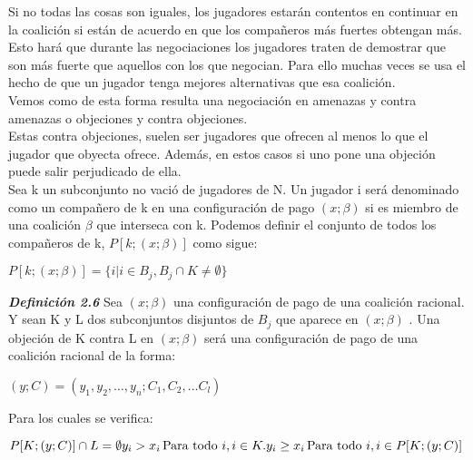 \documentclass[10pt,a4paper]{book}
\begin{document}
Si no todas las cosas son iguales, los jugadores estarán contentos en continuar en la coalición si están de acuerdo en que los compañeros más fuertes obtengan más.\\

Esto hará que durante las negociaciones los jugadores traten de demostrar que son más fuerte que aquellos con los que negocian. Para ello muchas veces se usa el hecho de que un jugador tenga mejores alternativas que esa coalición.\\

Vemos como de esta forma resulta una negociación en amenazas y contra amenazas o objeciones y contra objeciones.\\

Estas contra objeciones, suelen ser jugadores que ofrecen al menos lo que el jugador que obyecta ofrece. Además, en estos casos si uno pone una objeción puede salir perjudicado de ella.\\

Sea k un subconjunto no vació de jugadores de N. Un jugador i será denominado como un compañero de k en una configuración de pago $(x;\beta)$ si es miembro de una coalición $\beta$ que interseca con k. Podemos definir el conjunto de todos los compañeros de k, $P[k; (x;\beta)] $ como sigue:\\

\begin{center}

$P[k; (x;\beta)]=\{i| i \in B_j , B_j \cap K \neq  \emptyset \}$

\end{center}

\textit{\textbf{Definición 2.6}} Sea $(x;\beta)$  una configuración de pago de una coalición racional. Y sean K y L dos subconjuntos disjuntos de $B_j$ que aparece en $(x;\beta)$ . Una objeción de K contra L en $(x;\beta)$  será una configuración de pago de una coalición racional de la forma:\\
\begin{center}

$(y;C)=(y_1,y_2, \ldots ,y_n; C_1, C_2, \ldots C_l)$

\end{center}

Para los cuales se verifica:\\

\begin{center}

$P[K;(y;C)] \cap L = \emptyset \newline
y_i > x_i \thinspace \mbox{Para todo } i,i \in K. \newline
y_i \geq x_i \thinspace \mbox{Para todo } i,i \in P[K;(y;C)]$

\end{center}
\end{document}
